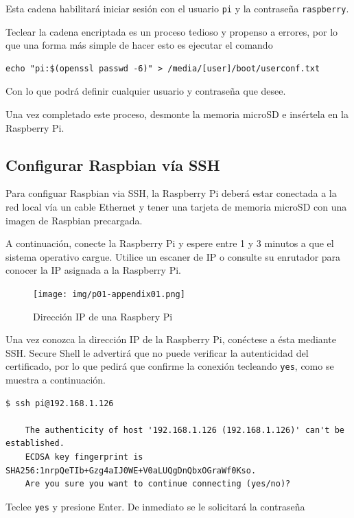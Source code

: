 \documentclass[letterpaper,10.5pt]{article}
\begin{document}
Esta cadena habilitará iniciar sesión con el usuario \texttt{pi} y la contraseña \texttt{raspberry}.

Teclear la cadena encriptada es un proceso tedioso y propenso a errores, por lo que una forma más simple de hacer esto es ejecutar el comando

\begin{Verbatim}[fontsize=\footnotesize]
echo "pi:$(openssl passwd -6)" > /media/[user]/boot/userconf.txt
\end{Verbatim}

Con lo que podrá definir cualquier usuario y contraseña que desee.

Una vez completado este proceso, desmonte la memoria microSD e insértela en la Raspberry Pi.

\subsection{Configurar Raspbian vía SSH}
Para configuar Raspbian via SSH, la Raspberry Pi deberá estar conectada a la red local vía un cable Ethernet y tener una tarjeta de memoria microSD con una imagen de Raspbian precargada.

A continuación, conecte la Raspberry Pi y espere entre 1 y 3 minutos a que el sistema operativo cargue.
Utilice un escaner de IP o consulte su enrutador para conocer la IP asignada a la Raspberry Pi.

\begin{figure}[H]
	\centering%
	\texttt{[image: img/p01-appendix01.png]} %
	\caption{Dirección IP de una Raspbery Pi}
	\label{fig:raspberry-ip} %
\end{figure}

Una vez conozca la dirección IP de la Raspberry Pi, conéctese a ésta mediante SSH. %
Secure Shell le advertirá que no puede verificar la autenticidad del certificado, por lo que pedirá que confirme la conexión tecleando \texttt{yes}, como se muestra a continuación.

\begin{Verbatim}[fontsize=\footnotesize]
$ ssh pi@192.168.1.126

    The authenticity of host '192.168.1.126 (192.168.1.126)' can't be established.
    ECDSA key fingerprint is SHA256:1nrpQeTIb+Gzg4aIJ0WE+V0aLUQgDnQbxOGraWf0Kso.
    Are you sure you want to continue connecting (yes/no)?
\end{Verbatim}

Teclee \texttt{yes} y presione Enter.
De inmediato se le solicitará la contraseña
\end{document}
